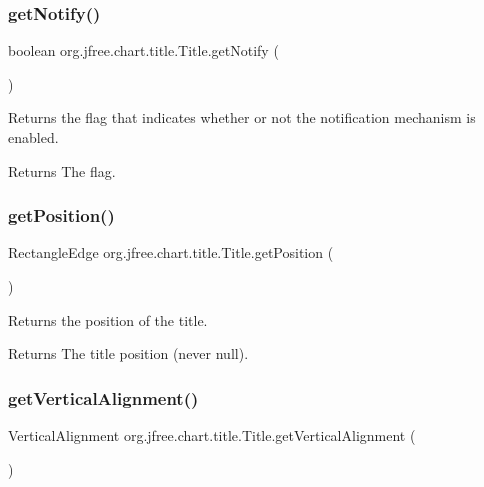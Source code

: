 \subsubsection{\texorpdfstring{get\+Notify()}{getNotify()}}
{\footnotesize\ttfamily boolean org.\+jfree.\+chart.\+title.\+Title.\+get\+Notify (\begin{DoxyParamCaption}{ }\end{DoxyParamCaption})}

Returns the flag that indicates whether or not the notification mechanism is enabled.

\begin{DoxyReturn}{Returns}
The flag. 
\end{DoxyReturn}
\mbox{\label{classorg_1_1jfree_1_1chart_1_1title_1_1_title_a72a94e96872e69a50ac6fa65f4be0019}} 
\subsubsection{\texorpdfstring{get\+Position()}{getPosition()}}
{\footnotesize\ttfamily Rectangle\+Edge org.\+jfree.\+chart.\+title.\+Title.\+get\+Position (\begin{DoxyParamCaption}{ }\end{DoxyParamCaption})}

Returns the position of the title.

\begin{DoxyReturn}{Returns}
The title position (never {\ttfamily null}). 
\end{DoxyReturn}
\mbox{\label{classorg_1_1jfree_1_1chart_1_1title_1_1_title_a994c87ab7e649b6b4a3a3353a9bb40ae}} 
\subsubsection{\texorpdfstring{get\+Vertical\+Alignment()}{getVerticalAlignment()}}
{\footnotesize\ttfamily Vertical\+Alignment org.\+jfree.\+chart.\+title.\+Title.\+get\+Vertical\+Alignment (\begin{DoxyParamCaption}{ }\end{DoxyParamCaption})}

